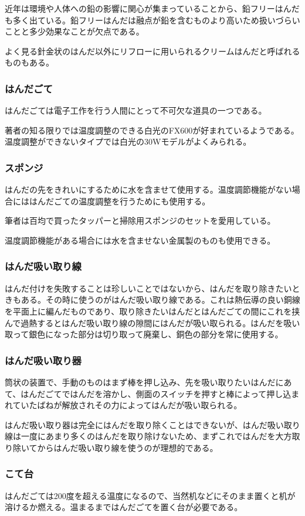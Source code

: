 \documentclass[a4paper,titlepage,here]{ujarticle}
\begin{document}
近年は環境や人体への鉛の影響に関心が集まっていることから、鉛フリーはんだも多く出ている。鉛フリーはんだは融点が鉛を含むものより高いため扱いづらいことと多少効果なことが欠点である。

よく見る針金状のはんだ以外にリフローに用いられるクリームはんだと呼ばれるものもある。
\subsubsection{はんだごて}
はんだごては電子工作を行う人間にとって不可欠な道具の一つである。

著者の知る限りでは温度調整のできる白光のFX600が好まれているようである。温度調整ができないタイプでは白光の30Wモデルがよくみられる。
\subsubsection{スポンジ}
はんだの先をきれいにするために水を含ませて使用する。温度調節機能がない場合にははんだごての温度調整を行うためにも使用する。

筆者は百均で買ったタッパーと掃除用スポンジのセットを愛用している。

温度調節機能がある場合には水を含ませない金属製のものも使用できる。
\subsubsection{はんだ吸い取り線}
はんだ付けを失敗することは珍しいことではないから、はんだを取り除きたいときもある。その時に使うのがはんだ吸い取り線である。これは熱伝導の良い銅線を平面上に編んだものであり、取り除きたいはんだとはんだごての間にこれを挟んで過熱するとはんだ吸い取り線の隙間にはんだが吸い取られる。はんだを吸い取って銀色になった部分は切り取って廃棄し、銅色の部分を常に使用する。
\subsubsection{はんだ吸い取り器}
筒状の装置で、手動のものはまず棒を押し込み、先を吸い取りたいはんだにあて、はんだごてではんだを溶かし、側面のスイッチを押すと棒によって押し込まれていたばねが解放されその力によってはんだが吸い取られる。

はんだ吸い取り器は完全にはんだを取り除くことはできないが、はんだ吸い取り線は一度にあまり多くのはんだを取り除けないため、まずこれではんだを大方取り除いてからはんだ吸い取り線を使うのが理想的である。
\subsubsection{こて台}
はんだごては200度を超える温度になるので、当然机などにそのまま置くと机が溶けるか燃える。温まるまではんだごてを置く台が必要である。
\end{document}
